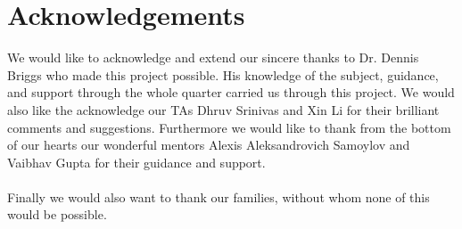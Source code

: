 \documentclass[12pt]{article}
\begin{document}
\section*{Acknowledgements}
We would like to acknowledge and extend our sincere thanks to Dr. Dennis Briggs who made this project possible.
His knowledge of the subject, guidance, and support through the whole quarter carried us through this project.
We would also like the acknowledge our TAs Dhruv Srinivas and Xin Li for their brilliant comments and suggestions. Furthermore we 
would like to thank from the bottom of our hearts our wonderful mentors Alexis Aleksandrovich Samoylov and Vaibhav Gupta for their guidance and support.
\\\\
Finally we would also want to thank our families, without whom none of this would be possible.
\pagebreak
\end{document}
